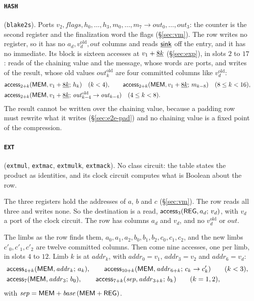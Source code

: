 \paragraph{\texttt{HASH}} (\texttt{blake2s}). Ports $v_2,\mathit{flags},h_0,\dots,h_3,m_0,\dots,m_7\to\mathit{out}_0,\dots,\mathit{out}_3$: the counter is the second register and the finalization word the flags (\S\ref{sec:vm}). The row writes no register, so it has no $a_d,v_d^{\mathrm{old}},\mathit{out}$ columns and reads $\underline{\mathsf{sink}}$ off the entry, and it has no immediate. Its block is sixteen accesses at $v_1+\underline{8k}$ (\S\ref{sec:exp}), in slots $2$ to $17$: reads of the chaining value and the message, whose words are ports, and writes of the result, whose old values $\mathit{out}^{\mathrm{old}}_k$ are four committed columns like $v_d^{\mathrm{old}}$:
\begin{align*}
  &\mathsf{access}_{2+k}( \mathsf{MEM},v_1+\underline{8k};\,h_k )\quad(k<4),\qquad
  \mathsf{access}_{2+k}( \mathsf{MEM},v_1+\underline{8k};\,m_{k-8} )\quad(8\le k<16),\\
  &\mathsf{access}_{2+k}( \mathsf{MEM},v_1+\underline{8k};\,\mathit{out}^{\mathrm{old}}_{k-4}\to\mathit{out}_{k-4} )\quad(4\le k<8).
\end{align*}
The result cannot be written over the chaining value, because a padding row must rewrite what it writes (\S\ref{sec:e2e-pad}) and no chaining value is a fixed point of the compression.

\paragraph{\texttt{EXT}} (\texttt{extmul}, \texttt{extmac}, \texttt{extmulk}, \texttt{extmack}). No class circuit: the table states the product as identities, and its clock circuit computes what is Boolean about the row.

The three registers hold the addresses of $a$, $b$ and $c$ (\S\ref{sec:vm}). The row reads all three and writes none. So the destination is a read, $\mathsf{access}_{3}( \mathsf{REG},a_d;\,v_d )$, with $v_d$ a port of the clock circuit. The row has columns $a_d$ and $v_d$, and no $v_d^{\mathrm{old}}$ or $\mathit{out}$.

The limbs as the row finds them, $a_0,a_1,a_2,b_0,b_1,b_2,c_0,c_1,c_2$, and the new limbs $c'_0,c'_1,c'_2$ are twelve committed columns. Then come nine accesses, one per limb, in slots $4$ to $12$. Limb $k$ is at $\mathit{addr}_k$, with $\mathit{addr}_0=v_1$, $\mathit{addr}_3=v_2$ and $\mathit{addr}_6=v_d$:
\begin{align*}
  &\mathsf{access}_{4+k}( \mathsf{MEM},\mathit{addr}_k;\,a_k ),\qquad
  \mathsf{access}_{10+k}( \mathsf{MEM},\mathit{addr}_{6+k};\,c_k\to c'_k )\qquad(k<3),\\
  &\mathsf{access}_{7}( \mathsf{MEM},\mathit{addr}_3;\,b_0 ),\qquad
  \mathsf{access}_{7+k}( \mathit{sep},\mathit{addr}_{3+k};\,b_k )\qquad(k=1,2),
\end{align*}
with $\mathit{sep}=\mathsf{MEM}+\mathit{base}\,(\mathsf{MEM}+\mathsf{REG})$.

